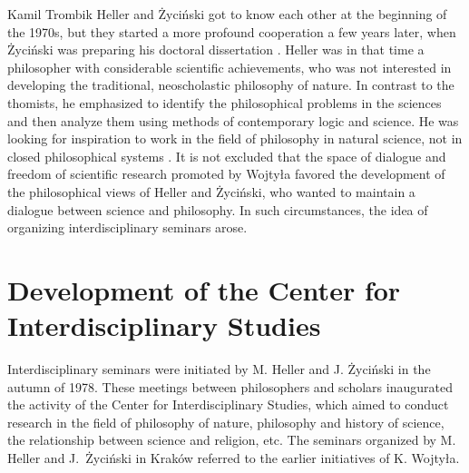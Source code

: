 \begin{artengenv}{Kamil Trombik}
Heller and Życiński got to know each other at the beginning of the 1970s, but they started a more profound cooperation a
few years later, when Życiński was preparing his doctoral dissertation
\parencite[p.230]{heller_wierze_2016}.
Heller was in that time a philosopher with considerable scientific achievements, who was not interested in
developing the traditional, neoscholastic philosophy of nature. In contrast to the thomists, he emphasized to identify
the philosophical problems in the sciences and then analyze them using methods of contemporary logic and science. He
was looking for inspiration to work in the field of philosophy in natural science, not in closed philosophical systems
\parencite{polak_philosophy_2019}.
It is not excluded that the space of dialogue and freedom of scientific
research promoted by Wojtyła favored the development of the philosophical views of Heller and Życiński, who wanted to
maintain a dialogue between science and philosophy. In such circumstances, the idea of organizing interdisciplinary
seminars arose.

\section{Development of the Center for Interdisciplinary Studies}

Interdisciplinary seminars were initiated by M. Heller and J. Życiński in the autumn of 1978. These meetings between
philosophers and scholars inaugurated the activity of the Center for Interdisciplinary Studies, which aimed to conduct
research in the field of philosophy of nature, philosophy and history of science, the relationship between science and
religion, etc. The seminars organized by M. Heller and J.~Życiński in Kraków referred to the earlier initiatives of K.
Wojtyła.


\end{artengenv}
